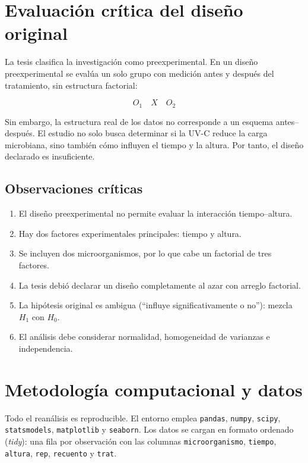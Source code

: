 \documentclass[12pt,a4paper]{article}
\begin{document}
\section{Evaluación crítica del diseño original}

La tesis clasifica la investigación como preexperimental. En un diseño preexperimental se evalúa un solo grupo con medición antes y después del tratamiento, sin estructura factorial:

\[
O_1 \quad X \quad O_2
\]

Sin embargo, la estructura real de los datos no corresponde a un esquema antes--después. El estudio no solo busca determinar si la UV-C reduce la carga microbiana, sino también cómo influyen el tiempo y la altura. Por tanto, el diseño declarado es insuficiente.

\subsection{Observaciones críticas}

\begin{enumerate}[label=\alph*)]
    \item El diseño preexperimental no permite evaluar la interacción tiempo--altura.
    \item Hay dos factores experimentales principales: tiempo y altura.
    \item Se incluyen dos microorganismos, por lo que cabe un factorial de tres factores.
    \item La tesis debió declarar un diseño completamente al azar con arreglo factorial.
    \item La hipótesis original es ambigua (``influye significativamente o no''): mezcla $H_1$ con $H_0$.
    \item El análisis debe considerar normalidad, homogeneidad de varianzas e independencia.
\end{enumerate}

\section{Metodología computacional y datos}

Todo el reanálisis es reproducible. El entorno emplea \texttt{pandas}, \texttt{numpy}, \texttt{scipy}, \texttt{statsmodels}, \texttt{matplotlib} y \texttt{seaborn}. Los datos se cargan en formato ordenado (\textit{tidy}): una fila por observación con las columnas \texttt{microorganismo}, \texttt{tiempo}, \texttt{altura}, \texttt{rep}, \texttt{recuento} y \texttt{trat}.
\end{document}
